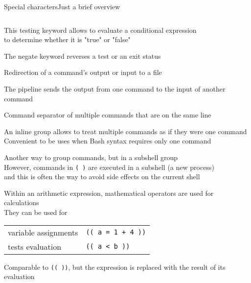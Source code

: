 \begin{frame}[fragile]{Special characters}{Just a brief overview}
\begin{columns}
\begin{column}{\dimexpr\paperwidth-10mm}
\begin{description}[\texttt{>  >>  <}]
                    This \alert{testing keyword} allows to evaluate a conditional expression \\
                    to determine whether it is "true" or "false"
                \item<only@2>[\texttt{!}]
                    The \alert{negate keyword} reverses a test or an exit status
                \item<only@2>[\texttt{>  >>  <}]
                    \alert{Redirection} of a command's output or input to a file
                \item<only@2>[\texttt{|}]
                    The \alert{pipeline} sends the output from one command to the input of another command
                \item<only@2>[\texttt{;}]
                    \alert{Command separator} of multiple commands that are on the same line 
                \item<only@2>[\texttt{\{ \}}]
                    An \alert{inline group} allows to treat multiple commands as if they were one command
                    Convenient to be uses when Bash syntax requires only one command
                \item<only@2>[\texttt{( )}]
                    Another way to group commands, but in a \alert{subshell group} \\
                    However, commands in \texttt{( )} are executed in a subshell (a new process) \\
                    and this is often the way to avoid side effects on the current shell
                \item<only@3-4>[\texttt{(( ))}]
                     Within an \alert{arithmetic expression}, mathematical operators are used for calculations \\
                     They can be used for\\
                     \begin{tabular}{ll}
                        \PB{$\bullet\;$} variable assignments   & \texttt{(( a = 1 + 4 ))}  \\
                        \PB{$\bullet\;$} tests evaluation       & \texttt{(( a < b ))}      \\
                    \end{tabular}
                \item<only@3-4>[\texttt{\$(( ))}]
                    Comparable to \texttt{(( ))}, but the expression is replaced with the result of its evaluation
                \item<only@3-4>[\texttt{*  ?}]

\end{description}
\end{column}
\end{columns}
\end{frame}
